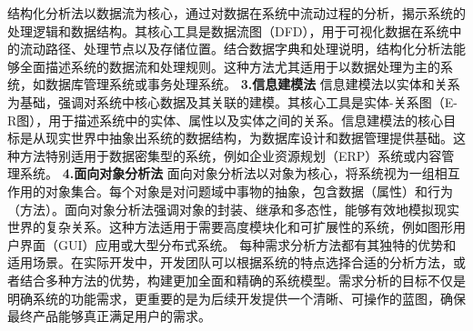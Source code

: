 结构化分析法以数据流为核心，通过对数据在系统中流动过程的分析，揭示系统的处理逻辑和数据结构。其核心工具是数据流图（DFD），用于可视化数据在系统中的流动路径、处理节点以及存储位置。结合数据字典和处理说明，结构化分析法能够全面描述系统的数据流和处理规则。这种方法尤其适用于以数据处理为主的系统，如数据库管理系统或事务处理系统。 \textbf{3.信息建模法} 信息建模法以实体和关系为基础，强调对系统中核心数据及其关联的建模。其核心工具是实体-关系图（E-R图），用于描述系统中的实体、属性以及实体之间的关系。信息建模法的核心目标是从现实世界中抽象出系统的数据结构，为数据库设计和数据管理提供基础。这种方法特别适用于数据密集型的系统，例如企业资源规划（ERP）系统或内容管理系统。 \textbf{4.面向对象分析法} 面向对象分析法以对象为核心，将系统视为一组相互作用的对象集合。每个对象是对问题域中事物的抽象，包含数据（属性）和行为（方法）。面向对象分析法强调对象的封装、继承和多态性，能够有效地模拟现实世界的复杂关系。这种方法适用于需要高度模块化和可扩展性的系统，例如图形用户界面（GUI）应用或大型分布式系统。 每种需求分析方法都有其独特的优势和适用场景。在实际开发中，开发团队可以根据系统的特点选择合适的分析方法，或者结合多种方法的优势，构建更加全面和精确的系统模型。需求分析的目标不仅是明确系统的功能需求，更重要的是为后续开发提供一个清晰、可操作的蓝图，确保最终产品能够真正满足用户的需求。

